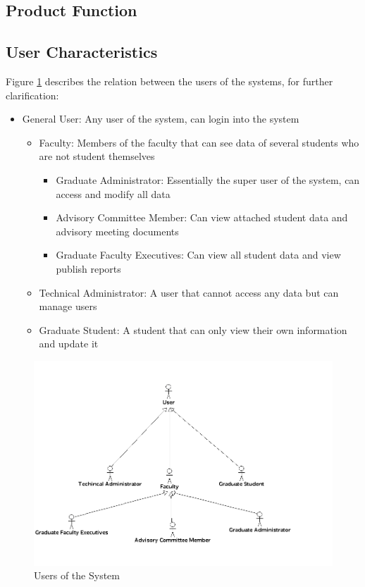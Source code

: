 \documentclass[11pt,a4paper]{report}
\begin{document}
\subsection{Product Function}
\subsection{User Characteristics}
Figure \ref{fig:users} describes the relation between the users of the systems, for further clarification:
\begin{itemize}
\item General User: Any user of the system, can login into the system 
\begin{itemize}
\item Faculty: Members of the faculty that can see data of several students who are not student themselves
\begin{itemize}
\item Graduate Administrator: Essentially the super user of the system, can access and modify all data 
\item Advisory Committee Member: Can view attached student data and advisory meeting documents
\item Graduate Faculty Executives: Can view all student data and view publish reports 	
\end{itemize}
\item Technical Administrator: A user that cannot access any data but can manage users 
\item Graduate Student: A student that can only view their own information and update it
\end{itemize}
\end{itemize}

\begin{figure}[htp]
\centering
\includegraphics[scale=0.40]{diagrams/use_cases/UserHeirachy_uc.png}
\caption{Users of the System}
\label{fig:users}
\end{figure}
\end{document}
